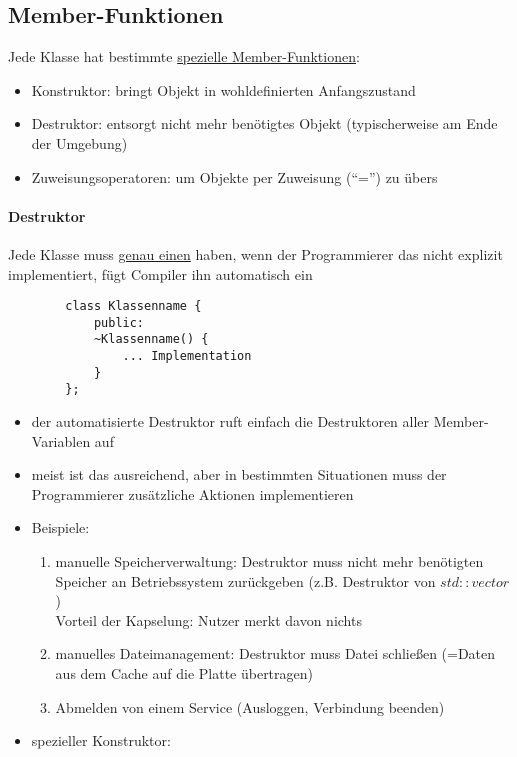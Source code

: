 \documentclass{article}
\begin{document}
\subsection{Member-Funktionen}
	Jede Klasse hat bestimmte \underline{spezielle Member-Funktionen}:
	\begin{itemize}
		\item Konstruktor: bringt Objekt in wohldefinierten Anfangszustand
		\item Destruktor: entsorgt nicht mehr benötigtes Objekt (typischerweise am Ende der Umgebung)
		\item Zuweisungsoperatoren: um Objekte per Zuweisung (``='') zu übers
	\end{itemize}

\paragraph{Destruktor}
	Jede Klasse muss \underline{genau einen} haben, wenn der Programmierer das nicht explizit implementiert, fügt Compiler ihn automatisch ein
	\begin{lstlisting}
		class Klassenname {
			public:
			~Klassenname() {
				... Implementation
			}
		};
	\end{lstlisting}

	\begin{itemize}
		\item der automatisierte Destruktor ruft einfach die Destruktoren aller Member-Variablen auf
		\item meist ist das ausreichend, aber in bestimmten Situationen muss der Programmierer zusätzliche Aktionen implementieren
		\item Beispiele:
		\begin{enumerate}
			\item manuelle Speicherverwaltung: Destruktor muss nicht mehr benötigten Speicher an Betriebssystem zurückgeben (z.B. Destruktor von $std::vector$) \\
			Vorteil der Kapselung: Nutzer merkt davon nichts
			\item manuelles Dateimanagement: Destruktor muss Datei schließen (=Daten aus dem Cache auf die Platte übertragen)
			\item Abmelden von einem Service (Ausloggen, Verbindung beenden)
		\end{enumerate}
		\item spezieller Konstruktor:
	\end{itemize}
\end{document}

